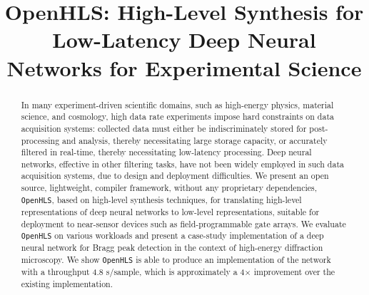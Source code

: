 \documentclass[10pt]{sig-alternate}
\title{OpenHLS: High-Level Synthesis for Low-Latency Deep Neural Networks for Experimental Science}
\begin{document}
\maketitle
\thispagestyle{firstpage}
\pagestyle{plain}




\begin{abstract}
In many experiment-driven scientific domains, such as high-energy
physics, material science, and cosmology, high data rate experiments
impose hard constraints on data acquisition systems:
collected data must either be indiscriminately stored for post-processing
and analysis, thereby necessitating large storage capacity, or accurately
filtered in real-time, thereby necessitating low-latency processing.
Deep neural networks, effective in other filtering tasks, have
not been widely employed in such data acquisition systems, due to
design and deployment difficulties. We present an open source,
lightweight, compiler framework, without any proprietary dependencies, \texttt{OpenHLS}, based on high-level
synthesis techniques, for translating high-level representations of
deep neural networks to low-level representations, suitable for deployment
to near-sensor devices such as field-programmable gate arrays. We
evaluate \texttt{OpenHLS} on various workloads and present a case-study
implementation of a deep neural network for Bragg peak detection in
the context of high-energy diffraction microscopy. We show \texttt{OpenHLS}
is able to produce an implementation of the network with a throughput
4.8 \textmu s/sample, which is approximately a 4$\times$ improvement
over the existing implementation.

\end{abstract}
\end{document}
